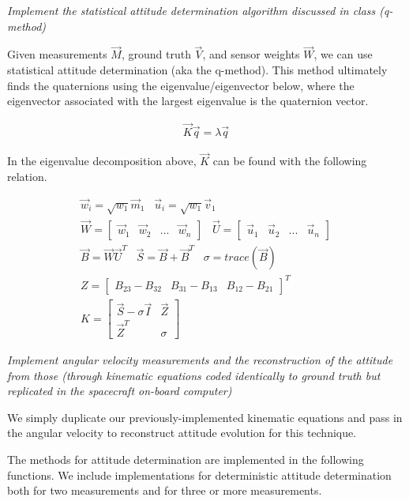 \textit{Implement the statistical attitude determination algorithm discussed in class (q-method)}

Given measurements $\Vec{M}$, ground truth $\Vec{V}$, and sensor weights $\Vec{W}$, we can use statistical attitude determination (aka the q-method). This method ultimately finds the quaternions using the eigenvalue/eigenvector below, where the eigenvector associated with the largest eigenvalue is the quaternion vector.

\begin{align*}
    \Vec{K} \Vec{q} = \lambda \Vec{q}
\end{align*}

In the eigenvalue decomposition above, $\Vec{K}$ can be found with the following relation.

\begin{align*}
    \Vec{w}_i = \sqrt{w_1} \Vec{m}_1 \;\;\;
    \Vec{u}_i = \sqrt{w_1} \Vec{v}_1 \\
    \Vec{W} = 
    \begin{bmatrix}
        \Vec{w}_1 & \Vec{w}_2 & ... & \Vec{w}_n
    \end{bmatrix} \;\;\;
    \Vec{U} = 
    \begin{bmatrix}
        \Vec{u}_1 & \Vec{u}_2 & ... & \Vec{u}_n
    \end{bmatrix} \\
    \Vec{B} = \Vec{W} \Vec{U}^T \;\;\;
    \Vec{S} = \Vec{B} + \Vec{B}^T \;\;\;
    \sigma = trace (\Vec{B}) \\
    Z = 
    \begin{bmatrix}
        B_{23} - B_{32} & B_{31} - B_{13} & B_{12} - B_{21}
    \end{bmatrix} ^T \\
    K = 
    \begin{bmatrix}
        \Vec{S} - \sigma \Vec{I} & \Vec{Z} \\
        \Vec{Z}^T & \sigma
    \end{bmatrix}
\end{align*}


\textit{Implement angular velocity measurements and the reconstruction of the attitude from those (through kinematic equations coded identically to ground truth but replicated in the spacecraft on-board computer)}

We simply duplicate our previously-implemented kinematic equations and pass in the angular velocity to reconstruct attitude evolution for this technique.

The methods for attitude determination are implemented in the following functions. We include implementations for deterministic attitude determination both for two measurements and for three or more measurements.

